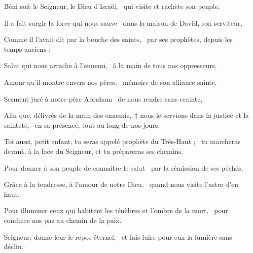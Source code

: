 \item Béni soit le Seigneur, le Dieu d’Israël,~\psstar{} qui visite et rachète son peuple.

\item Il a fait surgir la force qui nous sauve~\psstar{} dans la maison de David, son serviteur,

\item Comme il l’avait dit par la bouche des saints,~\psstar{} par ses prophètes, depuis les temps anciens :

\item Salut qui nous arrache à l’ennemi,~\psstar{} à la main de tous nos oppresseurs,

\item Amour qu’il montre envers nos pères,~\psstar{} mémoire de son alliance sainte,

\item Serment juré à notre père Abraham~\psstar{} de nous rendre sans crainte,

\item Afin que, délivrés de la main des ennemis,~† nous le servions dans la justice et la sainteté,~\psstar{} en sa présence, tout au long de nos jours.

\item Toi aussi, petit enfant, tu seras appelé prophète du Très-Haut ;~\psstar{} tu marcheras devant, à la face du Seigneur, et tu prépareras ses chemins,

\item Pour donner à son peuple de connaître le salut~\psstar{} par la rémission de ses péchés,

\item Grâce à la tendresse, à l’amour de notre Dieu,~\psstar{} quand nous visite l’astre d’en haut,

\item Pour illuminer ceux qui habitent les ténèbres et l’ombre de la mort,~\psstar{} pour conduire nos pas au chemin de la paix.

\item Seigneur, donne-leur le repos éternel,~\psstar{} et fais luire pour eux la lumière sans déclin.